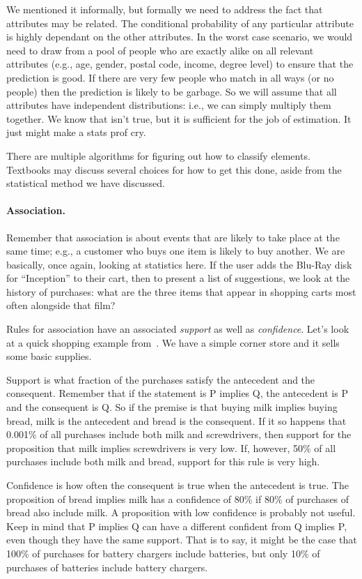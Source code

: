 \documentclass[a4paper]{report}
\begin{document}
We mentioned it informally, but formally we need to address the fact that attributes may be related. The conditional probability of any particular attribute is highly dependant on the other attributes. In the worst case scenario, we would need to draw from a pool of people who are exactly alike on all relevant attributes (e.g., age, gender, postal code, income, degree level) to ensure that the prediction is good. If there are very few people who match in all ways (or no people) then the prediction is likely to be garbage.  So we will assume that all attributes have independent distributions: i.e., we can simply multiply them together. We know that isn't true, but it is sufficient for the job of estimation. It just might make a stats prof cry.

There are multiple algorithms for figuring out how to classify elements. Textbooks may discuss several choices for how to get this done, aside from the statistical method we have discussed. 



\paragraph{Association.} Remember that association is about events that are likely to take place at the same time; e.g., a customer who buys one item is likely to buy another. We are basically, once again, looking at statistics here. If the user adds the Blu-Ray disk for ``Inception'' to their cart, then to present a list of suggestions, we look at the history of purchases: what are the three items that appear in shopping carts most often alongside that film?

Rules for association have an associated \textit{support} as well as \textit{confidence}. Let's look at a quick shopping example from~\cite{dsc}. We have a simple corner store and it sells some basic supplies.

Support is what fraction of the purchases satisfy the antecedent and the consequent. Remember that if the statement is P implies Q, the antecedent is P and the consequent is Q. So if the premise is that buying milk implies buying bread, milk is the antecedent and bread is the consequent. If it so happens that 0.001\% of all purchases include both milk and screwdrivers, then support for the proposition that milk implies screwdrivers is very low. If, however, 50\% of all purchases include both milk and bread, support for this rule is very high.

Confidence is how often the consequent is true when the antecedent is true. The proposition of bread implies milk has a confidence of 80\% if 80\% of purchases of bread also include milk. A proposition with low confidence is probably not useful. Keep in mind that P implies Q can have a different confident from Q implies P, even though they have the same support. That is to say, it might be the case that 100\% of purchases for battery chargers include batteries, but only 10\% of purchases of batteries include battery chargers.
\end{document}
